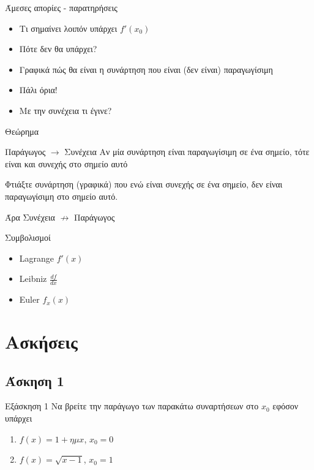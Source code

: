 \documentclass[greek]{beamer}
\begin{document}
\begin{frame}{Άμεσες απορίες - παρατηρήσεις}
 \begin{itemize}
  \item<1-> Τι σημαίνει λοιπόν υπάρχει $f'(x_0)$
  \item<2-> Πότε δεν θα υπάρχει?
  \item<3-> Γραφικά πώς θα είναι η συνάρτηση που είναι (δεν είναι) παραγωγίσιμη
  \item<4-> Πάλι όρια!
  \item<5-> Με την συνέχεια τι έγινε?
 \end{itemize}
\end{frame}

\begin{frame}{Θεώρημα}
 \begin{block}{Παράγωγος $\to$ Συνέχεια}
  Αν μία συνάρτηση είναι παραγωγίσιμη σε ένα σημείο, τότε είναι και συνεχής στο σημείο αυτό
 \end{block}
  Φτιάξτε συνάρτηση (γραφικά) που ενώ είναι συνεχής σε ένα σημείο, δεν είναι παραγωγίσιμη στο σημείο αυτό.

  Άρα Συνέχεια $\nrightarrow$ Παράγωγος
\end{frame}

\begin{frame}{Συμβολισμοί}
 \begin{itemize}
  \item<1-> Lagrange $f'(x)$
  \item<2-> Leibniz $\frac{df}{dx}$
  \item<3-> Euler $f_x(x)$
 \end{itemize}
\end{frame}

\section{Ασκήσεις}
\subsection{Άσκηση 1}
\begin{frame}[label=Άσκηση1]{Εξάσκηση 1}
 Να βρείτε την παράγωγο των παρακάτω συναρτήσεων στο $x_0$ εφόσον υπάρχει
 \begin{enumerate}
  \item<1-> $f(x)=1+ημx$, $x_0=0$
  \item<2-> $f(x)=\sqrt{x-1}$, $x_0=1$
 \end{enumerate}

\end{frame}
\end{document}
